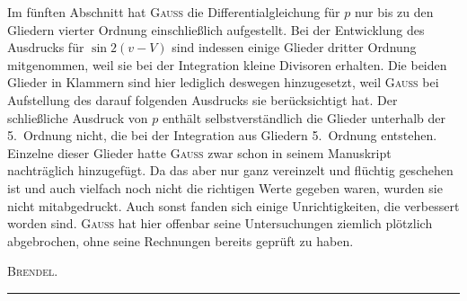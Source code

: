 \par\noindent\hspace*{\parindent}Im fünften Abschnitt hat \textsc{Gauss} die Differentialgleichung für \(p\) nur bis zu den Gliedern vierter Ordnung
einschließlich aufgestellt. Bei der Entwicklung des Ausdrucks für \(\sin 2(v-V)\) sind indessen einige
Glieder dritter Ordnung mitgenommen, weil sie bei der Integration kleine Divisoren erhalten. Die beiden
Glieder in Klammern sind hier lediglich deswegen hinzugesetzt, weil \textsc{Gauss} bei Aufstellung des darauf
folgenden Ausdrucks sie berücksichtigt hat. Der schließliche Ausdruck von \(p\) enthält selbstverständlich
die Glieder unterhalb der 5.~Ordnung nicht, die bei der Integration aus Gliedern 5.~Ordnung entstehen.
Einzelne dieser Glieder hatte \textsc{Gauss} zwar schon in seinem Manuskript nachträglich hinzugefügt. Da
das aber nur ganz vereinzelt und flüchtig geschehen ist und auch vielfach noch nicht die richtigen Werte
gegeben waren, wurden sie nicht mitabgedruckt. Auch sonst fanden sich einige Unrichtigkeiten,
die verbessert worden sind. \textsc{Gauss} hat hier offenbar seine Untersuchungen ziemlich plötzlich abgebrochen,
ohne seine Rechnungen bereits geprüft zu haben.
\begin{flushright}\textsc{Brendel}.\end{flushright}
\par\begin{center}\rule{.24\linewidth}{.4pt}\end{center}
\clearpage
\endgroup
